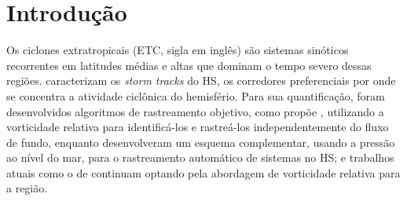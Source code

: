 \chapter{Introdução} \label{ch:introduccion}


Os ciclones extratropicais (ETC, sigla em inglês) são sistemas sinóticos recorrentes em latitudes médias e altas que dominam o tempo severo dessas regiões.
\citet{hoskins2005new} caracterizam os \textit{storm tracks} do HS, os corredores preferenciais por onde se concentra a atividade ciclônica do hemisfério.
Para sua quantificação, foram desenvolvidos algoritmos de rastreamento objetivo, como propõe \citet{sinclair1994objective}, utilizando a vorticidade relativa para identificá-los e rastreá-los independentemente do fluxo de fundo, enquanto \citet{simmonds1999southern} desenvolveram um esquema complementar, usando a pressão ao nível do mar, para o rastreamento automático de sistemas no HS; e trabalhos atuais como o de \citet{padilhareinke2024objective} continuam optando pela abordagem de vorticidade relativa para a região.

